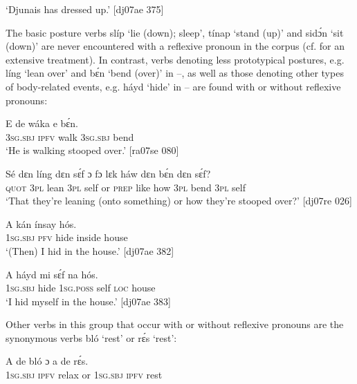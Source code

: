 \glt ‘Djunais has dressed up.’ [dj07ae 375]
\z

The basic posture verbs slíp ‘lie (down); sleep’, tínap ‘stand (up)’ and sidɔ́n ‘sit (down)’ are never encountered with a reflexive pronoun in the corpus (cf.  for an extensive treatment). In contrast, verbs denoting less prototypical postures, e.g. líng ‘lean over’ and bɛ́n ‘bend (over)’ in –, as well as those denoting other types of body-related events, e.g. háyd ‘hide’ in – are found with or without reflexive pronouns:


\ea%
    \label{ex:key:1303}
    \gll E    de  wáka  e    bɛ́n.\\
\textsc{3sg.sbj}  \textsc{ipfv}  walk  \textsc{3sg.sbj}  bend\\

\glt ‘He is walking stooped over.’ [ra07se 080]
\z


\ea%
    \label{ex:key:1304}
    \gll Sé    dɛn  líng    dɛn  sɛ́f  ɔ  fɔ  lɛk  háw  
dɛn  bɛ́n    dɛn  sɛ́f?\\
\textsc{quot}    \textsc{3pl}  lean    \textsc{3pl}  self  or  \textsc{prep}  like  how  
\textsc{3pl}  bend  \textsc{3pl}  self\\

\glt ‘That they’re leaning (onto something) or how 
they’re stooped over?’ [dj07re 026]
\z


\ea%
    \label{ex:key:1305}
    \gll A    kán    ínsay  hós.\\
\textsc{1sg.sbj}  \textsc{pfv}  hide    inside  house\\

\glt ‘(Then) I hid in the house.’ [dj07ae 382]
\z


\ea%
    \label{ex:key:1306}
    \gll A    háyd  mi    sɛ́f  na  hós.\\
\textsc{1sg.sbj}  hide    \textsc{1sg.poss}  self  \textsc{loc}  house\\

\glt ‘I hid myself in the house.’ [dj07ae 383]
\z

Other verbs in this group that occur with or without reflexive pronouns are the synonymous verbs bló ‘rest’ or rɛ́s ‘rest’:


\ea%
    \label{ex:key:1307}
    \gll A    de  bló    ɔ  a    de  rɛ́s.\\
\textsc{1sg.sbj}  \textsc{ipfv}  relax  or  \textsc{1sg.sbj}  \textsc{ipfv}  rest\\

